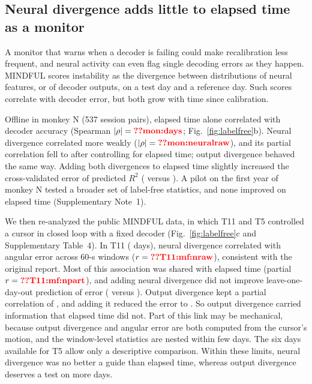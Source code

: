 \documentclass[pdflatex,sn-nature]{sn-jnl}
\begin{document}
\subsection*{Neural divergence adds little to elapsed time as a monitor}

A monitor that warns when a decoder is failing could make recalibration less frequent, and neural activity can even
flag single decoding errors as they happen\cite{evenchen2017}. MINDFUL scores instability as
the divergence between distributions of neural features, or of decoder outputs, on a test day and a reference
day\cite{pun2024}. Such scores correlate with decoder error, but both grow with time since calibration.

Offline in monkey N (537 session pairs), elapsed time alone correlated with decoder accuracy (Spearman
$|\rho| = \val{mon:days}$; Fig.~\ref{fig:labelfree}b). Neural divergence correlated more weakly
($|\rho| = \val{mon:neuralraw}$), and its partial correlation fell to  after controlling for elapsed
time; output divergence behaved the same way. Adding both divergences to elapsed time slightly increased the
cross-validated error of predicted $R^2$ ( versus ). A pilot on the first year of monkey
N tested a broader set of label-free statistics, and none improved on elapsed time (Supplementary Note~1).

We then re-analyzed the public MINDFUL data, in which T11 and T5 controlled a cursor in closed loop with a fixed decoder
(Fig.~\ref{fig:labelfree}c and Supplementary Table~4). In T11 ( days), neural divergence correlated with
angular error across 60-s windows ($r = \val{T11:mf:nraw}$), consistent with the original report\cite{pun2024}. Most of
this association was shared with elapsed time (partial $r = \val{T11:mf:npart}$), and adding neural divergence did not
improve leave-one-day-out prediction of error (\textdegree{} versus \textdegree{}).
Output divergence kept a partial correlation of , and adding it reduced the error to
\textdegree. So output divergence carried information that elapsed time did not. Part of this link
may be mechanical, because output divergence and angular error are both computed from the cursor's motion, and the
window-level statistics are nested within few days. The six days available for T5 allow only a descriptive comparison.
Within these limits, neural divergence was no better a guide than elapsed time, whereas output divergence deserves a
test on more days.
\end{document}
